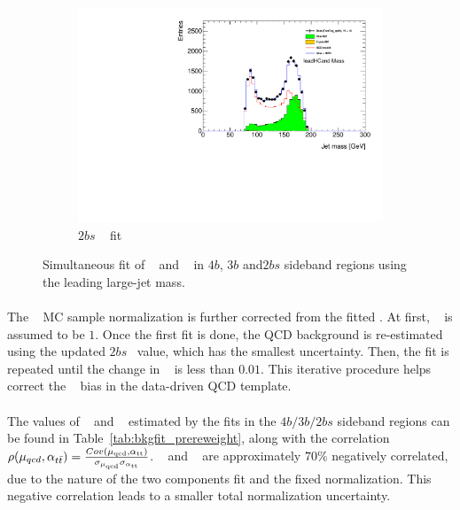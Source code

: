 \begin{figure}[htb!]
    \hspace{-4cm}
    \begin{subfigure}[b]{0.3\textwidth}
        \includegraphics[width=\textwidth,angle=-90]{figures/boosted/Fit/fitNorm_i2s.pdf}
        \caption{$2bs$ \mleadJ~ fit}
        \label{fig:ttbar-fit-2bs}
    \end{subfigure}
   \caption{Simultaneous fit of \muqcd~ and \alphatt~ in $4b$, $3b$ and$2bs$ sideband regions using the leading large-\R jet mass.}
  \label{fig:ttbar-fit}
\end{figure}

\paragraph{}
The \ttbar~ MC sample normalization is further corrected from the fitted \alphatt.
At first, \alphatt~ is assumed to be $1$.
Once the first fit is done, the QCD background is re-estimated using the updated $2bs$ \alphatt~value, which has the smallest uncertainty.
Then, the fit is repeated until the change in \alphatt~ is less than $0.01$.
This iterative procedure helps correct the \alphatt~ bias in the data-driven QCD template.

\paragraph{}
The values of \muqcd~ and \alphatt~ estimated by the fits in the $4b/3b/2bs$ sideband regions can be found in Table~\ref{tab:bkgfit_prereweight}, along with the correlation $\rho(\mu_{qcd},\alpha_{t\bar{t}}) = \frac{Cov(\rm \mu_{qcd},\rm \alpha_{tt})}{\rm \sigma_{\mu_{qcd}} \rm \sigma_{\alpha_{tt}} }$. 
\muqcd~ and \alphatt~ are approximately $70\%$ negatively correlated, due to the nature of the two components fit and the fixed normalization.
This negative correlation leads to a smaller total normalization uncertainty.

